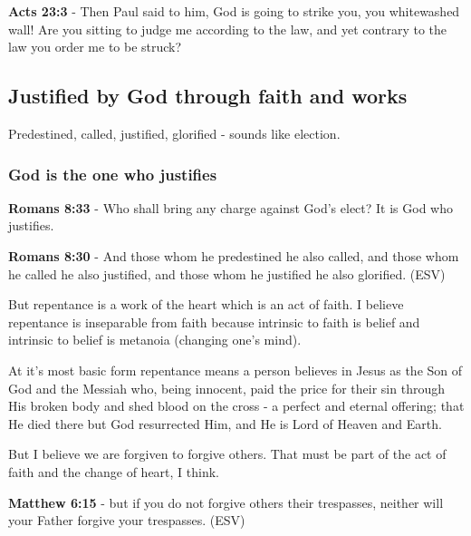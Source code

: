 \documentclass[11pt]{article}
\begin{document}
\textbf{Acts 23:3} - Then Paul said to him, God is going to strike you, you whitewashed wall! Are you sitting to judge me according to the law, and yet contrary to the law you order me to be struck?

\subsection{Justified by God through faith and works}
\label{sec:org47197d9}
Predestined, called, justified, glorified - sounds like election.
\subsubsection{God is the one who justifies}
\label{sec:org10c1447}

\textbf{Romans 8:33} - Who shall bring any charge against God's elect? It is God who justifies.

\textbf{Romans 8:30} - And those whom he predestined he also called, and those whom he called he also justified, and those whom he justified he also glorified. (ESV)

But repentance is a work of the heart which is an act of faith.
I believe repentance is inseparable from faith because intrinsic to faith is belief and intrinsic to belief is metanoia (changing one's mind).

At it's most basic form repentance means a person believes in Jesus as the Son of God and the Messiah who, being innocent, paid the price for their sin through His broken body and shed blood on the cross - a perfect and eternal offering; that He died there but God resurrected Him, and He is Lord of Heaven and Earth.

But I believe we are forgiven to forgive others. That must be part of the act of faith and the change of heart, I think.

\textbf{Matthew 6:15} - but if you do not forgive others their trespasses, neither will your Father forgive your trespasses. (ESV)
\end{document}
